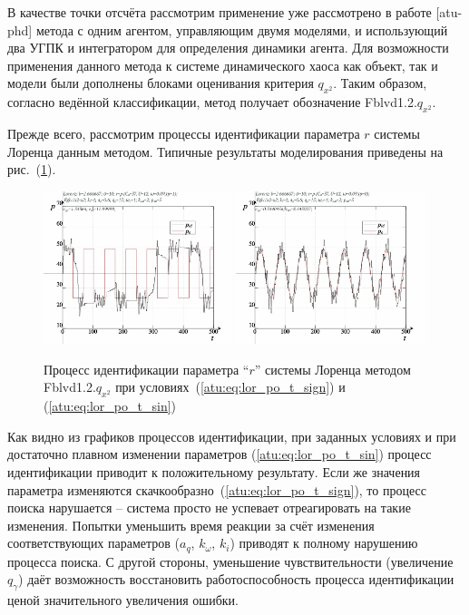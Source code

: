 В качестве точки отсчёта рассмотрим применение уже рассмотрено в работе [atu-phd]
метода с одним агентом, управляющим двумя моделями,
и использующий два УГПК и интегратором для определения динамики агента.
Для возможности применения данного метода к системе динамического хаоса
как объект, так и модели были дополнены блоками оценивания критерия $q_{x^2}$.
Таким образом, согласно ведённой классификации,
метод получает обозначение
Fblvd1.2.$q_{x^2}$.

Прежде всего, рассмотрим процессы идентификации параметра $r$
системы Лоренца данным методом. Типичные результаты моделирования
приведены на рис.~(\ref{atu:f:lor_id_Fblvd1}).

\begin{figure}[h!]
  \centerline{
    \includegraphics[width=0.49\textwidth]{p/cha/lor/Fblvd1_2/Fblvd1_2-p_xz_1_wp009.png}
    \hfill
    \includegraphics[width=0.49\textwidth]{p/cha/lor/Fblvd1_2/Fblvd1_2-p_xz_0_wp009.png}
  }
  \caption{Процесс идентификации параметра ``$r$'' системы Лоренца методом Fblvd1.2.$q_{x^2}$ при условиях~(\ref{atu:eq:lor_po_t_sign}) и (\ref{atu:eq:lor_po_t_sin})}
  \label{atu:f:lor_id_Fblvd1}
\end{figure}

Как видно из графиков процессов идентификации,
при заданных условиях и
при достаточно плавном изменении параметров
(\ref{atu:eq:lor_po_t_sin}) процесс идентификации приводит
к положительному результату. Если же значения параметра изменяются
скачкообразно~(\ref{atu:eq:lor_po_t_sign}),
то процесс поиска нарушается -- система просто не успевает
отреагировать на такие изменения. Попытки уменьшить
время реакции за счёт изменения соответствующих
параметров ($a_q$, $k_\omega$, $k_i$) приводят к полному нарушению
процесса поиска. С другой стороны, уменьшение чувствительности
(увеличение $q_\gamma$) даёт возможность восстановить
работоспособность процесса идентификации ценой
значительного увеличения ошибки.

